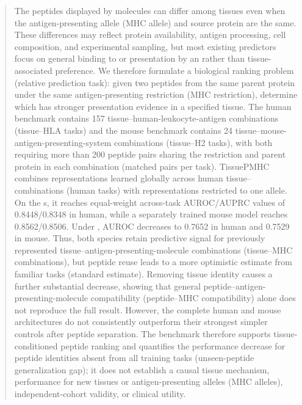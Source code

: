 \begin{abstract}
The peptides displayed by \plainMHCI{} molecules can differ among tissues even when the antigen-presenting allele (MHC allele) and source protein are the same. These differences may reflect protein availability, antigen processing, cell composition, and experimental sampling, but most existing predictors focus on general binding to or presentation by an \plainMHC{} rather than tissue-associated preference. We therefore formulate a biological ranking problem (relative prediction task): given two peptides from the same parent protein under the same antigen-presenting restriction (MHC restriction), determine which has stronger presentation evidence in a specified tissue. The human benchmark contains 157 tissue--human-leukocyte-antigen combinations (tissue--HLA tasks) and the mouse benchmark contains 24 tissue--mouse-antigen-presenting-system combinations (tissue--H2 tasks), with both requiring more than 200 peptide pairs sharing the restriction and parent protein in each combination (matched pairs per task). TissuePMHC combines representations learned globally across human tissue--\plainHLA{} combinations (human tasks) with representations restricted to one \plainHLA{} allele. On the \plainFixedTest{}s, it reaches equal-weight across-task AUROC/AUPRC values of 0.8448/0.8348 in human, while a separately trained mouse model reaches 0.8562/0.8506. Under \plainPeptideOOF{}, AUROC decreases to 0.7652 in human and 0.7529 in mouse. Thus, both species retain predictive signal for previously represented tissue--antigen-presenting-molecule combinations (tissue--MHC combinations), but peptide reuse leads to a more optimistic estimate from familiar tasks (standard estimate). Removing tissue identity causes a further substantial decrease, showing that general peptide--antigen-presenting-molecule compatibility (peptide--MHC compatibility) alone does not reproduce the full result. However, the complete human and mouse architectures do not consistently outperform their strongest simpler controls after peptide separation. The benchmark therefore supports tissue-conditioned peptide ranking and quantifies the performance decrease for peptide identities absent from all training tasks (unseen-peptide generalization gap); it does not establish a causal tissue mechanism, performance for new tissues or antigen-presenting alleles (MHC alleles), independent-cohort validity, or clinical utility.
\end{abstract}
